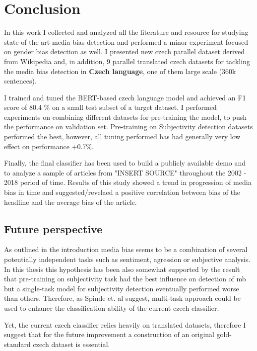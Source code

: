 \chapter{Conclusion}
In this work I collected and analyzed all the literature and resource for studying state-of-the-art media bias detection and performed a minor experiment focused on gender bias detection as well. I presented new czech parallel dataset derived from Wikipedia and, in addition, 9 parallel translated czech datasets for tackling the media bias detection in \textbf{Czech language}, one of them large scale (360k sentences).

I trained and tuned the BERT-based czech language model and achieved an F1 score of 80.4 \% on a small test subset of a target dataset. I performed experiments on combining different datasets for pre-training the model, to push the performance on validation set. Pre-training on Subjectivity detection datasets performed the best, however, all tuning performed has had generally very low effect on performance +0.7\%. 

Finally, the final classifier has been used to build a publicly available demo and to analyze a sample of articles from "INSERT SOURCE" throughout the 2002 - 2018 period of time. Results of this study showed a trend in progression of media bias in time and suggested/revelaed a positive correlation between bias of the headline and the average bias of the article.



\section{Future perspective}
As outlined in the introduction media bias seems to be a combination of several potentially independent tasks such as sentiment, agression or subjective analysis. In this thesis this hypothesis has been also somewhat supported by the result that pre-training on subjectivity task had the best influence on detection of \gls{mb} but a single-task model for subjectivity detection eventually performed worse than others. Therefore, as Spinde et. al \cite{spindeexploiting} suggest, multi-task approach could be used to enhance the classification ability of the current czech classifier.

Yet, the current czech classifier relies heavily on translated datasets, therefore I suggest that for the future improvement a construction of an original gold-standard czech dataset is essential.
